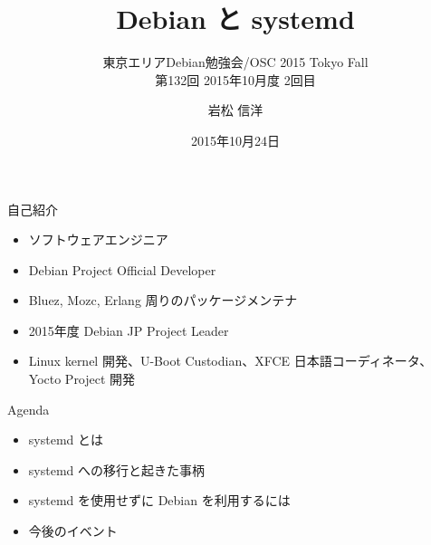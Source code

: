 \title{Debian と systemd}
\subtitle{東京エリアDebian勉強会/OSC 2015 Tokyo Fall\\第132回 2015年10月度 2回目}
\author{岩松 信洋}
\date{2015年10月24日}



\begin{frame}
\titlepage{}
\end{frame}

\begin{frame}{自己紹介}
\begin{itemize}
  \item ソフトウェアエンジニア
  \item Debian Project Official Developer
  \item Bluez, Mozc, Erlang 周りのパッケージメンテナ
  \item 2015年度 Debian JP Project Leader
  \item Linux kernel 開発、U-Boot Custodian、XFCE 日本語コーディネータ、Yocto Project 開発
 \end{itemize}
\end{frame}

\begin{frame}{Agenda}
  \begin{itemize}
   \item systemd とは
   \item systemd への移行と起きた事柄
   \item systemd を使用せずに Debian を利用するには
   \item 今後のイベント
  \end{itemize}
\end{frame}

